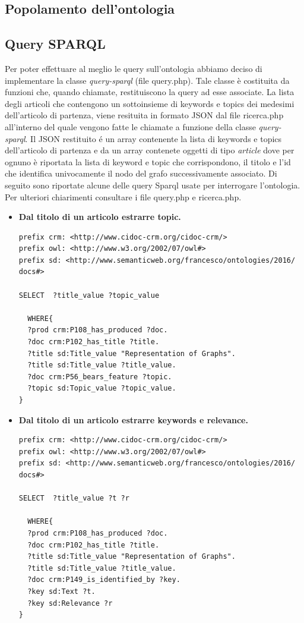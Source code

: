 \documentclass[11pt,a4paper]{article}
\begin{document}
\subsection{Popolamento dell'ontologia}


\subsection{Query SPARQL}

Per poter effettuare al meglio le query sull'ontologia abbiamo deciso di implementare la classe \textit{query-sparql} (file query.php). Tale classe è costituita da funzioni che, quando chiamate, restituiscono la query ad esse associate.
\newline \newline
La lista degli articoli che contengono un sottoinsieme di keywords e topics dei medesimi dell'articolo di partenza, viene resituita in formato JSON dal file ricerca.php all'interno del quale vengono fatte le chiamate a funzione della classe \textit{query-sparql}. Il JSON restituito \'e un array contenente la lista di keywords e topics dell'articolo di partenza e da un array contenete oggetti di tipo \textit{article} dove per ognuno è riportata la lista di keyword e topic che corrispondono, il titolo e l'id che identifica univocamente il nodo del grafo successivamente associato.
Di seguito sono riportate alcune delle query  Sparql usate per interrogare l'ontologia. Per ulteriori chiarimenti consultare i file query.php e ricerca.php.

\begin{itemize}
\item \textbf{Dal titolo di un articolo estrarre topic.}
\begin{lstlisting}
prefix crm: <http://www.cidoc-crm.org/cidoc-crm/>
prefix owl: <http://www.w3.org/2002/07/owl#>
prefix sd: <http://www.semanticweb.org/francesco/ontologies/2016/
docs#>

SELECT  ?title_value ?topic_value
 
  WHERE{
  ?prod crm:P108_has_produced ?doc.
  ?doc crm:P102_has_title ?title.
  ?title sd:Title_value "Representation of Graphs".
  ?title sd:Title_value ?title_value.
  ?doc crm:P56_bears_feature ?topic.
  ?topic sd:Topic_value ?topic_value.
}
\end{lstlisting}
\end{itemize}

\begin{itemize}
\item \textbf{Dal titolo di un articolo estrarre keywords e relevance.}
\begin{lstlisting}
prefix crm: <http://www.cidoc-crm.org/cidoc-crm/>
prefix owl: <http://www.w3.org/2002/07/owl#>
prefix sd: <http://www.semanticweb.org/francesco/ontologies/2016/
docs#>

SELECT  ?title_value ?t ?r
 
  WHERE{
  ?prod crm:P108_has_produced ?doc.
  ?doc crm:P102_has_title ?title.
  ?title sd:Title_value "Representation of Graphs".
  ?title sd:Title_value ?title_value.
  ?doc crm:P149_is_identified_by ?key.
  ?key sd:Text ?t.
  ?key sd:Relevance ?r
}
\end{lstlisting}
\end{itemize}
\end{document}

